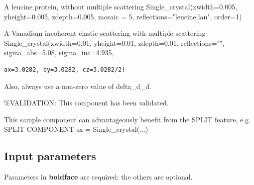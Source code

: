 A leucine protein, without multiple scattering Single\_crystal(xwidth=0.005, yheight=0.005, zdepth=0.005, mosaic = 5, reflections="leucine.lau", order=1)

A Vanadium incoherent elastic scattering with multiple scattering Single\_crystal(xwidth=0.01, yheight=0.01, zdepth=0.01, reflections="", sigma\_abs=5.08, sigma\_inc=4.935,

\begin{verbatim}
ax=3.0282, by=3.0282, cz=3.0282/2)
\end{verbatim}

Also, always use a non-zero value of delta\_d\_d.

\%VALIDATION: This component has been validated.

This sample component can advantageously benefit from the SPLIT feature, e.g. SPLIT COMPONENT sx = Single\_crystal(...)

\subsection*{Input parameters}
Parameters in \textbf{boldface} are required; the others are optional.

